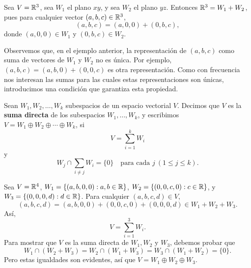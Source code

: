 \documentclass[12pt,a4paper]{book}
\begin{document}
    \begin{ejemplo}
        Sea $V=\mathbb{R}^3$, sea $W_1$ el plano $xy$, y sea $W_2$ el plano $yz$. Entonces $\mathbb{R}^3=W_1+W_2$, pues para cualquier vector $(a,b,c)\in\mathbb{R}^3$,
        \begin{equation*}
            (a,b,c)=(a,0,0)+(0,b,c),
        \end{equation*}
        donde $(a,0,0)\in W_1$ y $(0,b,c)\in W_2$.
    \end{ejemplo}

    Observemos que, en el ejemplo anterior, la representación de $(a,b,c)$ como suma de vectores de $W_1$ y $W_2$ no es única. Por ejemplo, $(a,b,c)=(a,b,0)+(0,0,c)$ es otra representación. Como con frecuencia nos interesan las sumas para las cuales estas representaciones son únicas, introducimos una condición que garantiza esta propiedad.

    \begin{definicion}
        Sean $W_1,W_2,\dots,W_k$ subespacios de un espacio vectorial $V$. Decimos que $V$ es la \textbf{suma directa} de los subespacios $W_1,\dots,W_k$, y escribimos $V=W_1\oplus W_2\oplus\cdots\oplus W_k$, si
        \begin{equation*}
            V=\sum_{i=1}^{k}W_i
        \end{equation*}
        y
        \begin{equation*}
            W_j\cap\sum_{i\neq j}W_i=\{0\}\quad\text{para cada } j\ (1\leq j\leq k).
        \end{equation*}
    \end{definicion}

    \begin{ejemplo}
        Sea $V=\mathbb{R}^4$, $W_1=\{(a,b,0,0): a,b\in\mathbb{R}\}$, $W_2=\{(0,0,c,0): c\in\mathbb{R}\}$, y $W_3=\{(0,0,0,d): d\in\mathbb{R}\}$. Para cualquier $(a,b,c,d)\in V$,
        \begin{equation*}
            (a,b,c,d)=(a,b,0,0)+(0,0,c,0)+(0,0,0,d)\in W_1+W_2+W_3.
        \end{equation*}
        Así,
        \begin{equation*}
            V=\sum_{i=1}^{3}W_i.
        \end{equation*}
        Para mostrar que $V$ es la suma directa de $W_1,W_2$ y $W_3$, debemos probar que
        \begin{equation*}
            W_1\cap(W_2+W_3)=W_2\cap(W_1+W_3)=W_3\cap(W_1+W_2)=\{0\}.
        \end{equation*}
        Pero estas igualdades son evidentes, así que $V=W_1\oplus W_2\oplus W_3$.
    \end{ejemplo}
\end{document}

